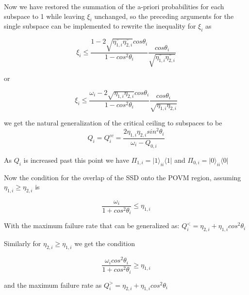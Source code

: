 \documentclass{beamer}
\begin{document}
\begin{frame}
Now we have restored the summation of the a-priori probabilities for each subspace to 1 while leaving $\xi_i$ unchanged, so the preceding arguments for the single subspace can be implemented to rewrite the inequality for $\xi_i$ as 

\[ \xi_i \leq \frac{1-2\sqrt{\bar{\eta_{1,i}} \bar{\eta_{2,i}}} cos \theta_i}{1-cos^2 \theta_i} \frac{cos\theta_i}{\sqrt{\bar{\eta_{1,i}} \bar{\eta_{2,i}}}}\]

or

\[ \xi_i \leq \frac{\omega_i-2\sqrt{\eta_{1,i} \eta_{2,i}} cos \theta_i}{1-cos^2 \theta_i} \frac{cos\theta_i}{\sqrt{\eta_{1,i}\eta_{2,i}}}\]
\end{frame}
\begin{frame}

 we get the natural generalization of the critical ceiling to subspaces to be
\[ Q_i = Q^{cc}_i =\frac{2\eta_{1,i} \eta_{2,i} sin^2 \theta_i }{\omega_i-Q_{0,i}}\] 

As $Q_i$ is increased past this point we have  $\Pi_{1,i} = \vert 1 \rangle_{ii} \langle 1 \vert $ and $\Pi_{0,i} = \vert 0 \rangle_{ii} \langle 0 \vert $ 
\end{frame}
\begin{frame}
 Now the condition for the overlap of the SSD onto the POVM region,  assuming $\eta_{1,i} \geq \eta_{2,i}$ is

 \[\frac{\omega_i}{1+cos^2 \theta_i} \leq \eta_{1,i}\]

With the maximum failure rate that can be generalized as: $Q^{<}_i = \eta_{2,i} + \eta_{1,i} cos^2 \theta_i$

Similarly for $\eta_{2,i} \geq \eta_{1,i}$ we get the condition 

 \[\frac{\omega_i cos^2 \theta_i}{1+cos^2 \theta_i} \geq \eta_{1,i}\]

and the maximum failure rate as  $Q^{>}_i = \eta_{2,i} + \eta_{1,i} cos^2 \theta_i$

\end{frame}
\end{document}
